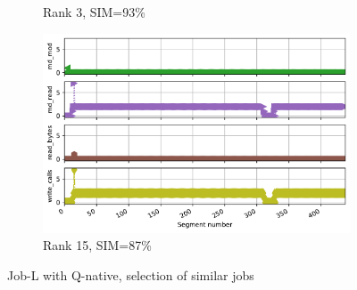 \documentclass{jhps}
\begin{document}
\begin{figure}[bt]
\begin{subfigure}{0.3\textwidth}
\caption{Rank 3, SIM=93\%}
\end{subfigure}
\begin{subfigure}{0.3\textwidth}
\includegraphics[width=\textwidth]{job_similarities_7488914-out/hex_native-0.8708--14timeseries4936553}
\caption{Rank 15, SIM=87\%}
\end{subfigure}

\caption{Job-L with Q-native, selection of similar jobs}%
\label{fig:job-L-hex-native}
\end{figure}
\end{document}
